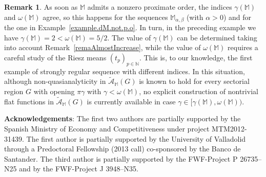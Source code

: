 \documentclass[11pt,a4paper]{article}
\theoremstyle{definition}
\newtheorem{rema}[theo]{Remark}
\def\a{\alpha}
\def\b{\beta}
\def\o{\omega}
\def\ga{\gamma}
\def\N{\mathbb{N}}
\def\M{\mathbb{M}}
\begin{document}
\begin{rema}
As soon as $\M$ admits a nonzero proximate order, the indices $\ga(\M)$ and $\o(\M)$ agree, so this happens for the sequences $\M_{\a,\b}$ (with $\a>0$) and for the one in Example~\ref{example.dM.not.p.o}. In turn, in the preceding example we have $\ga(\M)=2<\o(\M)=5/2$. The value of $\ga(\M)$ can be determined taking into account Remark~\ref{remaAlmostIncrease}, while the value of $\o(\M)$ requires a careful study of the Riesz means $(t_p)_{p\in\N}$. This is, to our knowledge, the first example of strongly regular sequence with different indices. In this situation, although non-quasianalyticity in $\widetilde{\mathcal{A}}_{\M}(G)$ is known to hold for every sectorial region $G$ with opening $\pi\gamma$ with $\gamma<\o(\M)$, no explicit construction of nontrivial flat functions in $\widetilde{\mathcal{A}}_{\M}(G)$ is currently available in case $\ga\in[\ga(\M),\o(\M))$.
\end{rema}



\noindent\textbf{Acknowledgements}: The first two authors are partially supported by the Spanish Ministry of Economy and Competitiveness under project MTM2012-31439. The first author is partially supported by the University of Valladolid through a Predoctoral Fellowship (2013 call) co-sponsored by the Banco de Santander. The third author is partially supported by the FWF-Project P 26735--N25 and by the FWF-Project J 3948--N35.
\end{document}
